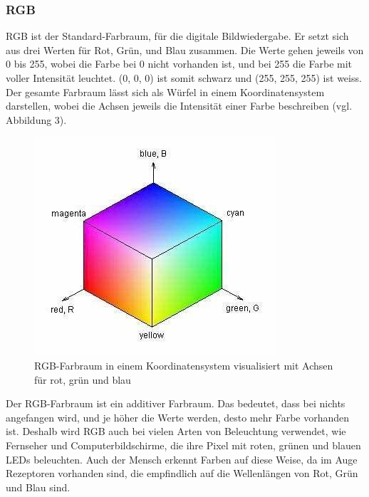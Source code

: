 \documentclass[a4paper, 12pt]{article}
\begin{document}
\subsubsection{RGB}
RGB ist der Standard-Farbraum, für die digitale Bildwiedergabe. Er setzt sich aus drei Werten für Rot, Grün, und Blau zusammen. Die Werte gehen jeweils von 0 bis 255, wobei die Farbe bei 0 nicht vorhanden ist, und bei 255 die Farbe mit voller Intensität leuchtet. (0, 0, 0) ist somit schwarz und (255, 255, 255) ist weiss. Der gesamte Farbraum lässt sich als Würfel in einem Koordinatensystem darstellen, wobei die Achsen jeweils die Intensität einer Farbe beschreiben (vgl. Abbildung 3).
\begin{figure}[H]
\includegraphics[scale=0.5]{RGB_Wuerfel}
\caption{RGB-Farbraum in einem Koordinatensystem visualisiert mit Achsen für rot, grün und blau}
\end{figure}
 Der RGB-Farbraum ist ein additiver Farbraum. Das bedeutet, dass bei nichts angefangen wird, und je höher die Werte werden, desto mehr Farbe vorhanden ist. Deshalb wird RGB auch bei vielen Arten von Beleuchtung verwendet, wie Fernseher und Computerbildschirme, die ihre Pixel mit roten, grünen und blauen LEDs beleuchten. Auch der Mensch erkennt Farben auf diese Weise, da im Auge Rezeptoren vorhanden sind, die empfindlich auf die Wellenlängen von Rot, Grün und Blau sind.
\end{document}

